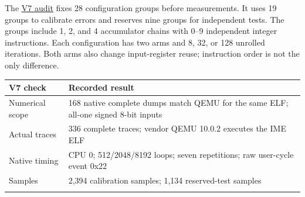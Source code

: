 \documentclass[10pt,a4paper]{article}
\begin{document}
The
\href{https://github.com/MoyaMryia/riscv-accl/blob/main/spacemit/reports/2026-10-12-k1-model-v7.md}{V7
audit} fixes 28 configuration groups before measurements. It uses 19
groups to calibrate errors and reserves nine groups for independent
tests. The groups include 1, 2, and 4 accumulator chains with 0--9
independent integer instructions. Each configuration has two arms and 8,
32, or 128 unrolled iterations. Both arms also change input-register
reuse; instruction order is not the only difference.

\begin{longtable}[]{@{}ll@{}}
\toprule
\begin{minipage}[b]{0.47\columnwidth}\raggedright
V7 check\strut
\end{minipage} & \begin{minipage}[b]{0.47\columnwidth}\raggedright
Recorded result\strut
\end{minipage}\tabularnewline
\midrule
\endhead
\begin{minipage}[t]{0.47\columnwidth}\raggedright
Numerical scope\strut
\end{minipage} & \begin{minipage}[t]{0.47\columnwidth}\raggedright
168 native complete dumps match QEMU for the same ELF; all-one signed
8-bit inputs\strut
\end{minipage}\tabularnewline
\begin{minipage}[t]{0.47\columnwidth}\raggedright
Actual traces\strut
\end{minipage} & \begin{minipage}[t]{0.47\columnwidth}\raggedright
336 complete traces; vendor QEMU 10.0.2 executes the IME ELF\strut
\end{minipage}\tabularnewline
\begin{minipage}[t]{0.47\columnwidth}\raggedright
Native timing\strut
\end{minipage} & \begin{minipage}[t]{0.47\columnwidth}\raggedright
CPU 0; 512/2048/8192 loops; seven repetitions; raw user-cycle event
0x22\strut
\end{minipage}\tabularnewline
\begin{minipage}[t]{0.47\columnwidth}\raggedright
Samples\strut
\end{minipage} & \begin{minipage}[t]{0.47\columnwidth}\raggedright
2,394 calibration samples; 1,134 reserved-test samples\strut
\end{minipage}\tabularnewline
\begin{minipage}[t]{0.47\columnwidth}\raggedright

\end{minipage}
\end{longtable}
\end{document}
